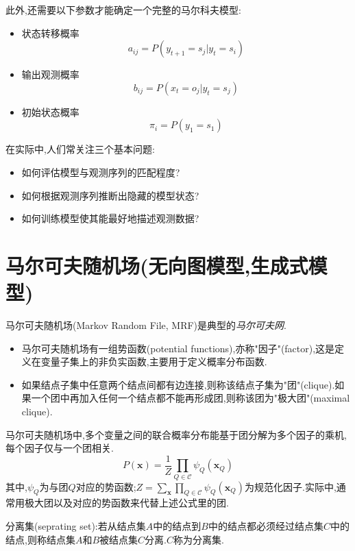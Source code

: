 此外,还需要以下参数才能确定一个完整的马尔科夫模型:
\begin{itemize}
\item 状态转移概率
\begin{equation}
a_{ij}=P(y_{t+1}=s_j|y_t=s_i)
\end{equation}
\item 输出观测概率
\begin{equation}
b_{ij}=P(x_t=o_j|y_t=s_j)
\end{equation}
\item 初始状态概率
\begin{equation}
\pi_i=P(y_1=s_1)
\end{equation}
\end{itemize}

在实际中,人们常关注三个基本问题:
\begin{itemize}
\item 如何评估模型与观测序列的匹配程度?
\item 如何根据观测序列推断出隐藏的模型状态?
\item 如何训练模型使其能最好地描述观测数据?
\end{itemize}

\section{马尔可夫随机场(无向图模型,生成式模型)}

马尔可夫随机场(Markov Random File, MRF)是典型的\textit{马尔可夫网}.
\begin{itemize}
\item 马尔可夫随机场有一组势函数(potential functions),亦称"因子"(factor),这是定义在变量子集上的非负实函数,主要用于定义概率分布函数.
\item 如果结点子集中任意两个结点间都有边连接,则称该结点子集为"团"(clique).如果一个团中再加入任何一个结点都不能再形成团,则称该团为"极大团"(maximal clique).
\end{itemize}

马尔可夫随机场中,多个变量之间的联合概率分布能基于团分解为多个因子的乘机,每个因子仅与一个团相关.
\begin{equation}
P(\bm x)=\frac{1}{Z}\prod_{Q\in\mathcal C}\psi_Q(\bm x_Q)
\end{equation}
其中,$\psi_Q$为与团$Q$对应的势函数;$Z=\sum_{\bm x}\prod_{Q\in\mathcal C}\psi_Q(\bm x_Q)$为规范化因子.实际中,通常用极大团以及对应的势函数来代替上述公式里的团.

分离集(seprating set):若从结点集$A$中的结点到$B$中的结点都必须经过结点集$C$中的结点,则称结点集$A$和$B$被结点集$C$分离.$C$称为分离集.

